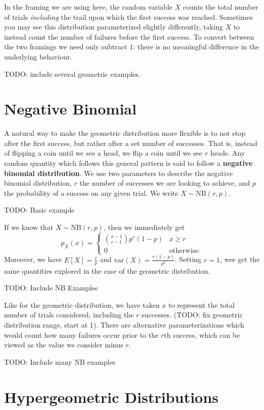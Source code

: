 \documentclass[
  letterpaper,
  DIV=11,
  numbers=noendperiod]{scrreprt}
\begin{document}
In the framing we are using here, the random variable \(X\) counts the
total number of trials \emph{including} the trail upon which the first
success was reached. Sometimes you may see this distribution
parameterized slightly differently, taking \(X\) to instead count the
number of failures before the first success. To convert between the two
framings we need only subtract \(1\): there is no meaningful difference
in the underlying behaviour.

TODO: include several geometric examples.

\section{Negative Binomial}\label{negative-binomial}

A natural way to make the geometric distribution more flexible is to not
stop after the first success, but rather after a set number of
successes. That is, instead of flipping a coin until we see a head, we
flip a coin until we see \(r\) heads. Any random quantity which follows
this general pattern is said to follow a \textbf{negative binomial
distribution}. We use two parameters to describe the negative binomial
distribution, \(r\) the number of successes we are looking to achieve,
and \(p\) the probability of a success on any given trial. We write
\(X\sim\text{NB}(r,p)\).

TODO: Basic example

If we know that \(X\sim\text{NB}(r,p)\), then we immediately get
\[p_X(x) = \begin{cases}\binom{x-1}{r-1}p^r(1-p) & x\geq r \\ 0 &\text{otherwise}.\end{cases}\]
Moreover, we have \(E[X] = \frac{r}{p}\) and
\(\text{var}(X) = \frac{r(1-p)}{p^2}\). Setting \(r=1\), wee get the
same quantities explored in the case of the geometric distribution.

TODO: Include NB Examples

Like for the geometric distribution, we have taken \(x\) to represent
the total number of trials considered, including the \(r\) successes.
(TODO: fix geometric distribution range, start at 1). There are
alternative parameterizations which would count how many failures occur
prior to the \(r\)th success, which can be viewed as the value we
consider minus \(r\).

TODO: Include many NB examples

\section{Hypergeometric
Distributions}\label{hypergeometric-distributions}
\end{document}

